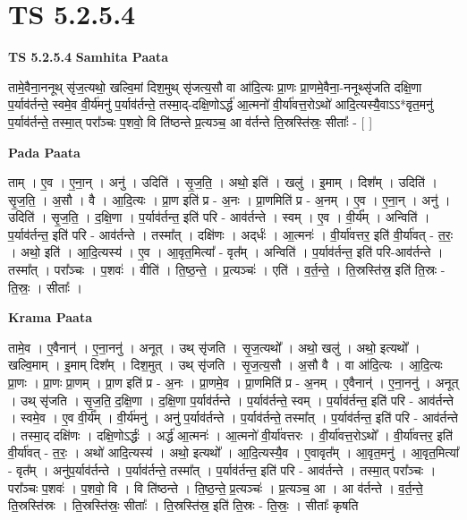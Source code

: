 \documentclass[17pt]{extarticle}
\begin{document}
\section{ TS 5.2.5.4 }

\textbf{TS 5.2.5.4 } \newline
\textbf{Samhita Paata} \newline

तामे॒वैना॒ननूथ् सृ॑ज॒त्यथो॒ खल्वि॒मां दिश॒मुथ् सृ॑जत्य॒सौ वा आ॑दि॒त्यः प्रा॒णः प्रा॒णमे॒वैना॒-ननूथ्सृ॑जति दक्षि॒णा प॒र्याव॑र्तन्ते॒ स्वमे॒व वी॒र्य॑मनु॑ प॒र्याव॑र्तन्ते॒ तस्मा॒द्-दक्षि॒णोऽर्द्ध॑ आ॒त्मनो॑ वी॒र्या॑वत्त॒रोऽथो॑ आदि॒त्यस्यै॒वाऽऽ*वृत॒मनु॑ प॒र्याव॑र्तन्ते॒ तस्मा॒त् परा᳚ञ्चः प॒शवो॒ वि ति॑ष्ठन्ते प्र॒त्यञ्च॒ आ व॑र्तन्ते ति॒स्रस्ति॑स्रः॒ सीताः᳚ - [  ] \newline

\textbf{Pada Paata} \newline

ताम् । ए॒व । ए॒ना॒न् । अनु॑ । उदिति॑ । सृ॒ज॒ति॒ । अथो॒ इति॑ । खलु॑ । इ॒माम् । दिश᳚म् । उदिति॑ । सृ॒ज॒ति॒ । अ॒सौ । वै । आ॒दि॒त्यः । प्रा॒ण इति॑ प्र - अ॒नः । प्रा॒णमिति॑ प्र - अ॒नम् । ए॒व । ए॒ना॒न् । अनु॑ । उदिति॑ । सृ॒ज॒ति॒ । द॒क्षि॒णा । प॒र्याव॑र्तन्त॒ इति॑ परि - आव॑र्तन्ते । स्वम् । ए॒व । वी॒र्य᳚म् । अन्विति॑ । प॒र्याव॑र्तन्त॒ इति॑ परि - आव॑र्तन्ते । तस्मा᳚त् । दक्षि॑णः । अद्‌र्धः॑ । आ॒त्मनः॑ । वी॒र्या॑वत्तर॒ इति॑ वी॒र्या॑वत् - त॒रः॒ । अथो॒ इति॑ । आ॒दि॒त्यस्य॑ । ए॒व । आ॒वृत॒मित्या᳚ - वृत᳚म् । अन्विति॑ । प॒र्याव॑र्तन्त॒ इति॑ परि-आव॑र्तन्ते । तस्मा᳚त् । परा᳚ञ्चः । प॒शवः॑ । वीति॑ । ति॒ष्ठ॒न्ते॒ । प्र॒त्यञ्चः॑ । एति॑ । व॒र्त॒न्ते॒ । ति॒स्रस्ति॑स्र॒ इति॑ ति॒स्रः - ति॒स्रः॒ । सीताः᳚ ।  \newline


\textbf{Krama Paata} \newline

तामे॒व । ए॒वैनान्॑ । ए॒ना॒ननु॑ । अनूत् । उथ् सृ॑जति । सृ॒ज॒त्यथो᳚ । अथो॒ खलु॑ । अथो॒ इत्यथो᳚ । खल्वि॒माम् । इ॒माम् दिश᳚म् । दिश॒मुत् । उथ् सृ॑जति । सृ॒ज॒त्य॒सौ । अ॒सौ वै । वा आ॑दि॒त्यः । आ॒दि॒त्यः प्रा॒णः । प्रा॒णः प्रा॒णम् । प्रा॒ण इति॑ प्र - अ॒नः । प्रा॒णमे॒व । प्रा॒णमिति॑ प्र - अ॒नम् । ए॒वैनान्॑ । ए॒ना॒ननु॑ । अनूत् । उथ् सृ॑जति । सृ॒ज॒ति॒ द॒क्षि॒णा । द॒क्षि॒णा प॒र्याव॑र्तन्ते । प॒र्याव॑र्तन्ते॒ स्वम् । प॒र्याव॑र्तन्त॒ इति॑ परि - आव॑र्तन्ते । स्वमे॒व । ए॒व वी॒र्य᳚म् । वी॒र्य॑मनु॑ । अनु॑ प॒र्याव॑र्तन्ते । प॒र्याव॑र्तन्ते॒ तस्मा᳚त् । प॒र्याव॑र्तन्त॒ इति॑ परि - आव॑र्तन्ते । तस्मा॒द् दक्षि॑णः । दक्षि॒णोऽर्द्धः॑ । अर्द्ध॑ आ॒त्मनः॑ । आ॒त्मनो॑ वी॒र्या॑वत्तरः । वी॒र्या॑वत्त॒रोऽथो᳚ । वी॒र्या॑वत्तर॒ इति॑ वी॒र्या॑वत् - त॒रः॒ । अथो॑ आदि॒त्यस्य॑ । अथो॒ इत्यथो᳚ । आ॒दि॒त्यस्यै॒व । ए॒वावृत᳚म् । आ॒वृत॒मनु॑ । आ॒वृत॒मित्या᳚ - वृत᳚म् । अनु॑प॒र्याव॑र्तन्ते । प॒र्याव॑र्तन्ते॒ तस्मा᳚त् । प॒र्याव॑र्तन्त॒ इति॑ परि - आव॑र्तन्ते । तस्मा॒त् परा᳚ञ्चः । परा᳚ञ्चः प॒शवः॑ । प॒शवो॒ वि । वि ति॑ष्ठन्ते । ति॒ष्ठ॒न्ते॒ प्र॒त्यञ्चः॑ । प्र॒त्यञ्च॒ आ । आ व॑र्तन्ते । व॒र्त॒न्ते॒ ति॒स्रस्ति॑स्रः । ति॒स्रस्ति॑स्रः॒ सीताः᳚ । ति॒स्रस्ति॑स्र॒ इति॑ ति॒स्रः - ति॒स्रः॒ । सीताः᳚ कृषति \newline
\end{document}

